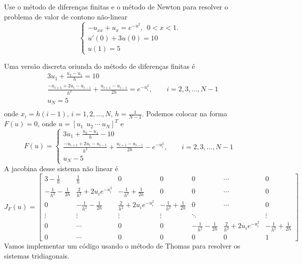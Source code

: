 \begin{ex}Use o método de diferenças finitas e o método de Newton para resolver o problema de valor de contono não-linear
$$\left\{\begin{array}{l}-u_{xx}+u_x=e^{-u^2},~~ 0<x<1.\\
u'(0)+3u(0)=10\\
u(1)=5\end{array}
\right.
$$
\end{ex}
Uma versão discreta oriunda do método de diferenças finitas é
\begin{align*}
 &3u_1+\frac{u_2-u_1}{h}=10\\
 &\frac{-u_{i+1}+2u_i-u_{i-1}}{h^2}+\frac{u_{i+1}-u_{i-1}}{2h}=e^{-u_i^2},\qquad i=2,3,...,N-1\\
 &u_N=5\\
\end{align*}
onde $x_i=h(i-1)$, $i=1,2,...,N$, $h=\frac{1}{N-1}$. Podemos colocar na forma $F(u)=0$, onde $u=[u_1\ \ u_2\ \cdots \ u_N]^T$ e 
\begin{equation*}
F(u)=\left\{\begin{array}{l} 3u_1+\frac{u_2-u_1}{h}-10\\
 \frac{-u_{i+1}+2u_i-u_{i-1}}{h^2}+\frac{u_{i+1}-u_{i-1}}{2h}-e^{-u_i^2},\qquad i=2,3,...,N-1\\
 u_N-5
\end{array}\right.
\end{equation*}
A jacobina desse sistema não linear é
\begin{equation*}
J_F(u)= \begin{bmatrix}
        3-\frac{1}{h}&\frac{1}{h}&0&0&0&\cdots&0\\
        -\frac{1}{h^2}-\frac{1}{2h}&\frac{2}{h^2}+2u_ie^{-u_i^2}&-\frac{1}{h^2}+\frac{1}{2h}&0&0&\cdots&0\\
              0&  -\frac{1}{h^2}-\frac{1}{2h}&\frac{2}{h^2}+2u_ie^{-u_i^2}&-\frac{1}{h^2}+\frac{1}{2h}&0&\cdots&0\\
              \vdots&\vdots&\vdots&\vdots&\ddots&&\vdots\\
              0&\cdots&0&0& -\frac{1}{h^2}-\frac{1}{2h}&\frac{2}{h^2}+2u_ie^{-u_i^2}&-\frac{1}{h^2}+\frac{1}{2h}\\
              0&\cdots&0&0&0& 0&1
       \end{bmatrix}
\end{equation*}
Vamos implementar um código usando o método de Thomas para resolver os sistemas tridiagonais.
